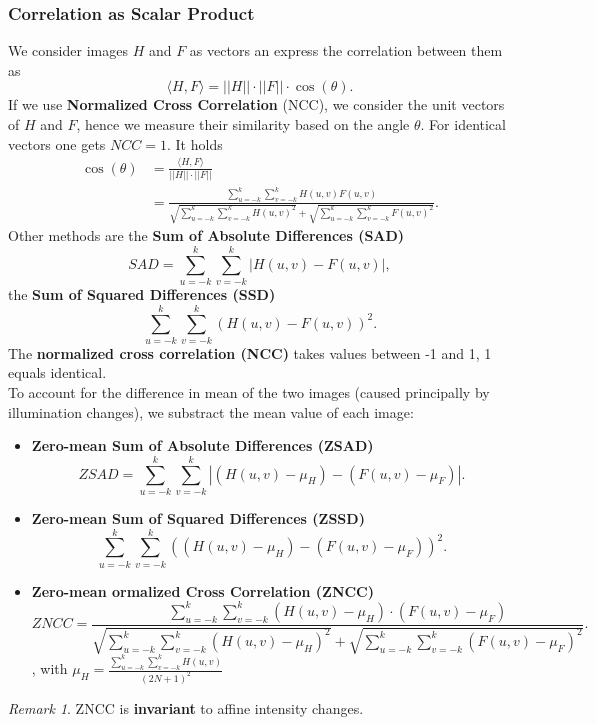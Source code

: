 \documentclass[a4paper,12 pt]{article}
\theoremstyle{definition}
\theoremstyle{remark}
\newtheorem*{bmk}{Remark}
\theoremstyle{definition}
\theoremstyle{definition}
\theoremstyle{definition}
\theoremstyle{remark}
\theoremstyle{definition}
\begin{document}
\subsubsection*{Correlation as Scalar Product}
We consider images $H$ and $F$ as vectors an express the correlation between them as
\begin{equation}
\langle H,F\rangle=||H|| \cdot ||F|| \cdot \cos(\theta).
\end{equation}
If we use \textbf{Normalized Cross Correlation} (NCC), we consider the unit vectors of $H$ and $F$, hence we measure their similarity based on the angle $\theta$. For identical vectors one gets $NCC=1$. It holds
\begin{equation}
\begin{split}
\cos(\theta)&=\frac{\langle H,F \rangle}{||H||\cdot ||F||}\\
&=\frac{\sum_{u=-k}^{k}\sum_{v=-k}^{k}H(u,v)F(u,v)}{\sqrt{\sum_{u=-k}^{k}\sum_{v=-k}^{k}H(u,v)^2}+\sqrt{\sum_{u=-k}^{k}\sum_{v=-k}^{k}F(u,v)^2}}.
\end{split}
\end{equation}
Other methods are the \textbf{Sum of Absolute Differences (SAD)}
\begin{equation}
SAD=\sum_{u=-k}^{k}\sum_{v=-k}^{k}|H(u,v)-F(u,v)|,
\end{equation}
the \textbf{Sum of Squared Differences (SSD)}
\begin{equation}
\sum_{u=-k}^{k}\sum_{v=-k}^{k}(H(u,v)-F(u,v))^2.
\end{equation}
The \textbf{normalized cross correlation (NCC)} takes values between -1 and 1, 1 equals identical. \\
To account for the difference in mean of the two images (caused principally by illumination changes), we substract the mean value of each image:
\begin{itemize}
\item \textbf{Zero-mean Sum of Absolute Differences (ZSAD)}
\begin{equation}
ZSAD=\sum_{u=-k}^{k}\sum_{v=-k}^{k}|(H(u,v)-\mu_H)-(F(u,v)-\mu_F)|.
\end{equation}
\item \textbf{Zero-mean Sum of Squared Differences (ZSSD)}
\begin{equation}
\sum_{u=-k}^{k}\sum_{v=-k}^{k}((H(u,v)-\mu_H)-(F(u,v)-\mu_F))^2.
\end{equation}
\item \textbf{Zero-mean ormalized Cross Correlation (ZNCC)}
\begin{equation}
ZNCC=\frac{\sum_{u=-k}^{k}\sum_{v=-k}^{k}(H(u,v)-\mu_H)\cdot (F(u,v)-\mu_F)}{\sqrt{\sum_{u=-k}^{k}\sum_{v=-k}^{k}(H(u,v)-\mu_H)^2}+\sqrt{\sum_{u=-k}^{k}\sum_{v=-k}^{k}(F(u,v)-\mu_F)^2}}.
\end{equation},
with $\mu_H=\frac{\sum_{u=-k}^{k}\sum_{v=-k}^{k} H(u,v)}{(2N+1)^2}$
\end{itemize}
\begin{bmk}
ZNCC is \textbf{invariant} to affine intensity changes.
\end{bmk}
\end{document}
